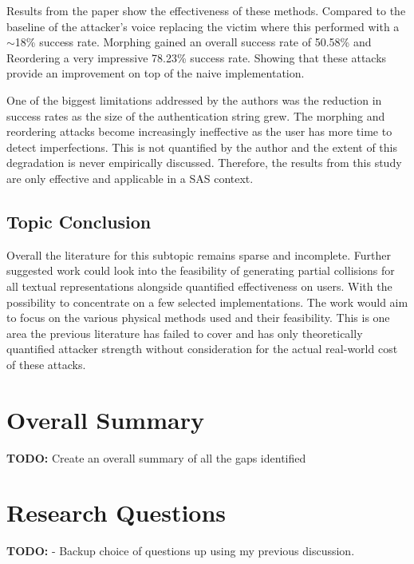 Results from the paper show the effectiveness of these 
methods. Compared to the baseline of the attacker's voice 
replacing the victim where this performed with a 
$\sim$18\% success rate. Morphing gained an 
overall success rate of 50.58\% and Reordering a very 
impressive 78.23\% success rate. Showing that these 
attacks provide an improvement on top of the naive implementation.

One of the biggest limitations addressed by the authors 
was the reduction in success rates as the size of the 
authentication string grew. The morphing and reordering 
attacks become increasingly ineffective as the user has 
more time to detect imperfections. This is not quantified by 
the author and the extent of this degradation is never 
empirically discussed. Therefore, the results from this 
study are only effective and applicable in a SAS context.



\subsection{Topic Conclusion}
Overall the literature for this subtopic remains sparse and incomplete. Further suggested work could look into the feasibility of generating partial collisions for all textual representations alongside quantified effectiveness on users. With the possibility to concentrate on a few selected implementations. The work would aim to focus on the various physical methods used and their feasibility. This is one area the previous literature has failed to cover and has only theoretically quantified attacker strength without consideration for the actual real-world cost of these attacks.

\section{Overall Summary}
\textbf{TODO: } Create an overall summary of all the gaps identified

\section{Research Questions}
\textbf{TODO: } - Backup choice of questions up using my previous discussion.